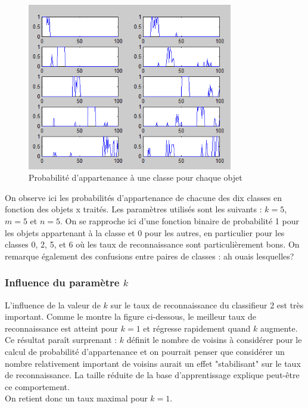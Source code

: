 \begin{figure}[h]
	\begin{center}
		\includegraphics[width=0.8\textwidth]{img/30-pbelonging2-5555.png}
	\end{center}
	\caption{Probabilité d'appartenance à une classe pour chaque objet}
	\label{fig:proba2}
\end{figure}

On observe ici les probabilités d'appartenance de chacune des dix classes en fonction des objets x traités. Les paramètres utilisés sont les suivants : $k=5$, $m=5$ et $n=5$.
On se rapproche ici d'une fonction binaire de probabilité 1 pour les objets appartenant à la classe et 0 pour les autres, en particulier pour les classes 0, 2, 5, et 6 où les taux de reconnaissance sont particulièrement bons. On remarque également des confusions entre paires de classes : ah ouais lesquelles?

\subsubsection{Influence du paramètre $k$}

L'influence de la valeur de $k$ sur le taux de reconnaissance du classifieur 2 est très important. Comme le montre la figure ci-dessous, le meilleur taux de reconnaissance est atteint pour $k=1$ et régresse rapidement quand $k$ augmente. Ce résultat paraît surprenant : $k$ définit le nombre de voisins à considérer pour le calcul de probabilité d'appartenance et on pourrait penser que considérer un nombre relativement important de voisins aurait un effet "stabilisant" sur le taux de reconnaissance. La taille réduite de la base d'apprentissage explique peut-être ce comportement.\\
On retient donc un taux maximal pour $k=1$.

